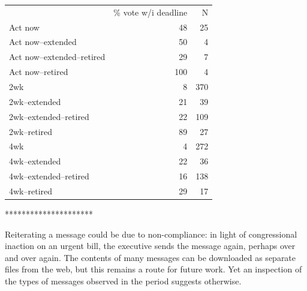 \documentclass[letter,12pt]{article}
\begin{document}
\begin{tabular}{lrr}
                           & \% vote w/i deadline  & N \\
Act now                    &    48                 & 25 \\
Act now--extended          &    50                 & 4  \\
Act now--extended--retired &    29                 & 7  \\
Act now--retired           &    100                & 4  \\
2wk                        &    8                  & 370\\
2wk--extended              &    21                 & 39 \\
2wk--extended--retired     &    22                 & 109\\
2wk--retired               &    89                 & 27 \\
4wk                        &    4                  & 272\\
4wk--extended              &    22                 & 36 \\
4wk--extended--retired     &    16                 & 138\\
4wk--retired               &    29                 & 17 \\
\end{tabular} 

*********************


Reiterating a message could be due to non-compliance: in light of congressional inaction on an urgent bill, the executive sends the message again, perhaps over and over again. The contents of many messages can be downloaded as separate files from the web, but this remains a route for future work. Yet an inspection of the types of messages observed in the period suggests otherwise. 
\end{document}
